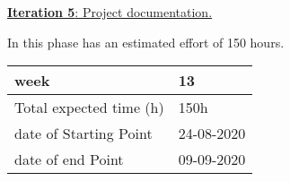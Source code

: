 \large{\underline{\textbf{Iteration 5}: Project documentation.}}

In this phase has an estimated effort of 150 hours.

\begin{table}[h!]
    \centering
    \begin{tabular}{|p{5cm}|p{4cm}|}
     \hline
        \cellcolor[gray]{0.9} week  & 13\\ \hline
        \cellcolor[gray]{0.9} Total expected time (h)  & 150h \\ \hline
        \cellcolor[gray]{0.9} date of Starting Point  & 24-08-2020 \\ \hline
        \cellcolor[gray]{0.9} date of end Point  & 09-09-2020 \\ \hline
            
\end{tabular}
\end{table}
